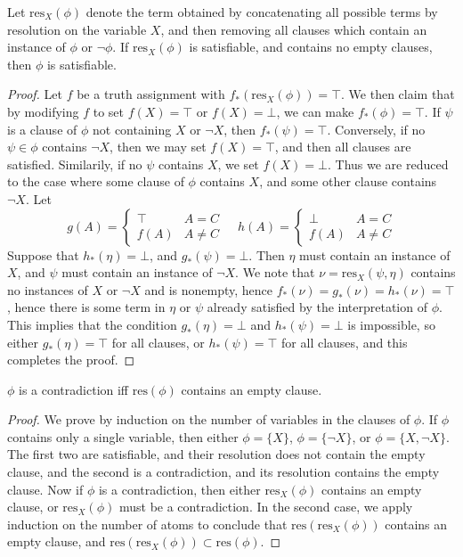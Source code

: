 \begin{lemma}
    Let $\text{res}_X(\phi)$ denote the term obtained by concatenating all possible terms by resolution on the variable $X$, and then removing all clauses which contain an instance of $\phi$ or $\neg \phi$. If $\text{res}_X(\phi)$ is satisfiable, and contains no empty clauses, then $\phi$ is satisfiable.
\end{lemma}
\begin{proof}
    Let $f$ be a truth assignment with $f_*(\text{res}_X(\phi)) = \top$. We then claim that by modifying $f$ to set $f(X) = \top$ or $f(X) = \bot$, we can make $f_*(\phi) = \top$. If $\psi$ is a clause of $\phi$ not containing $X$ or $\neg X$, then $f_*(\psi) = \top$. Conversely, if no $\psi \in \phi$ contains $\neg X$, then we may set $f(X) = \top$, and then all clauses are satisfied. Similarily, if no $\psi$ contains $X$, we set $f(X) = \bot$. Thus we are reduced to the case where some clause of $\phi$ contains $X$, and some other clause contains $\neg X$. Let
    \[ g(A) = \begin{cases} \top & A = C\\f(A) & A \neq C \end{cases}\ \ \ \ \ h(A) = \begin{cases} \bot & A = C\\ f(A) & A \neq C \end{cases} \]
    Suppose that $h_*(\eta) = \bot$, and $g_*(\psi) = \bot$. Then $\eta$ must contain an instance of $X$, and $\psi$ must contain an instance of $\neg X$. We note that $\nu = \text{res}_X(\psi,\eta)$ contains no instances of $X$ or $\neg X$ and is nonempty, hence $f_*(\nu) = g_*(\nu) = h_*(\nu) = \top$, hence there is some term in $\eta$ or $\psi$ already satisfied by the interpretation of $\phi$. This implies that the condition $g_*(\eta) = \bot$ and $h_*(\psi) = \bot$ is impossible, so either $g_*(\eta) = \top$ for all clauses, or $h_*(\psi) = \top$ for all clauses, and this completes the proof.
\end{proof}

\begin{theorem}
    $\phi$ is a contradiction iff $\text{res}(\phi)$ contains an empty clause.
\end{theorem}
\begin{proof}
    We prove by induction on the number of variables in the clauses of $\phi$. If $\phi$ contains only a single variable, then either $\phi = \{ X \}$, $\phi = \{ \neg X \}$, or $\phi = \{ X, \neg X \}$. The first two are satisfiable, and their resolution does not contain the empty clause, and the second is a contradiction, and its resolution contains the empty clause. Now if $\phi$ is a contradiction, then either $\text{res}_X(\phi)$ contains an empty clause, or $\text{res}_X(\phi)$ must be a contradiction. In the second case, we apply induction on the number of atoms to conclude that $\text{res}(\text{res}_X(\phi))$ contains an empty clause, and $\text{res}(\text{res}_X(\phi)) \subset \text{res}(\phi)$.
\end{proof}

